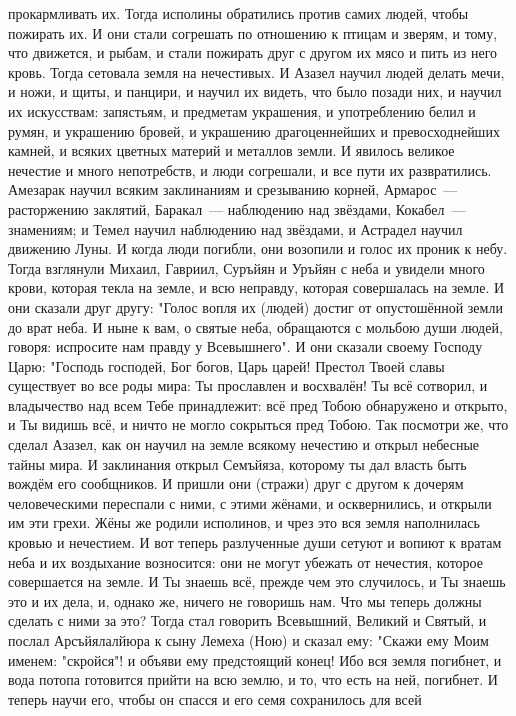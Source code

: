 прокармливать их.
Тогда исполины обратились против самих людей, чтобы пожирать их.
И они стали согрешать по отношению к птицам и зверям, и тому, что
движется, и рыбам, и стали пожирать друг с другом их мясо и пить из него кровь.
Тогда сетовала земля на нечестивых.
И Азазел научил людей делать мечи, и ножи, и щиты, и панцири, и
научил их видеть, что было позади них, и научил их искусствам: запястьям, и
предметам украшения, и употреблению белил и румян, и украшению бровей, и
украшению драгоценнейших и превосходнейших камней, и всяких цветных материй и
металлов земли.
И явилось великое нечестие и много непотребств, и люди согрешали, и
все пути их развратились.
Амезарак научил всяким заклинаниям и срезыванию корней, Армарос~---
расторжению заклятий, Баракал~--- наблюдению над звёздами, Кокабел~--- знамениям;
и Темел научил наблюдению над звёздами, и Астрадел научил движению Луны.
И когда люди погибли, они возопили и голос их проник к небу.
Тогда взглянули Михаил, Гавриил, Суръйян и Уръйян с неба и
увидели много крови, которая текла на земле, и всю неправду, которая
совершалась на земле.
И они сказали друг другу: "Голос вопля их (людей) достиг от
опустошённой земли до врат неба.
И ныне к вам, о святые неба, обращаются с мольбою души людей, говоря:
испросите нам правду у Всевышнего".
И они сказали своему Господу Царю: "Господь господей, Бог богов, Царь
царей!
Престол Твоей славы существует во все роды мира: Ты прославлен и
восхвалён!
Ты всё сотворил, и владычество над всем Тебе принадлежит: всё пред
Тобою обнаружено и открыто, и Ты видишь всё, и ничто не могло сокрыться пред
Тобою.
Так посмотри же, что сделал Азазел, как он научил на земле всякому
нечестию и открыл небесные тайны мира.
И заклинания открыл Семъйяза, которому ты дал власть быть вождём его
сообщников.
И пришли они (стражи) друг с другом к дочерям человеческими переспали
с ними, с этими жёнами, и осквернились, и открыли им эти грехи.
Жёны же родили исполинов, и чрез это вся земля наполнилась кровью и
нечестием.
И вот теперь разлученные души сетуют и вопиют к вратам неба и их
воздыхание возносится: они не могут убежать от нечестия, которое совершается
на земле.
И Ты знаешь всё, прежде чем это случилось, и Ты знаешь это и их дела,
и, однако же, ничего не говоришь нам.
Что мы теперь должны сделать с ними за это?
Тогда стал говорить Всевышний, Великий и Святый, и послал
Арсъйялалйюра к сыну Лемеха (Ною) и сказал ему: "Скажи ему Моим именем:
"скройся"!
и объяви ему предстоящий конец!
Ибо вся земля погибнет, и вода потопа готовится прийти на всю землю,
и то, что есть на ней, погибнет.
И теперь научи его, чтобы он спасся и его семя сохранилось для всей
